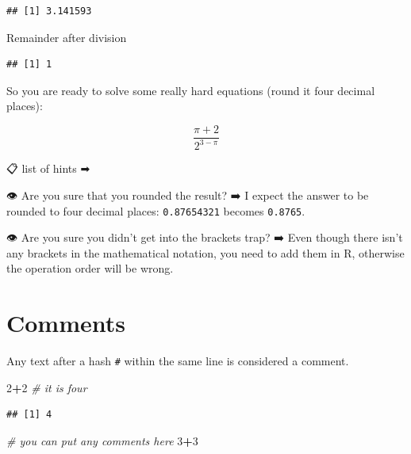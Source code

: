 \documentclass[
]{book}
\makeatletter
\newenvironment{Shaded}{\begin{snugshade}}{\end{snugshade}}
\newcommand{\CommentTok}[1]{\textcolor[rgb]{0.56,0.35,0.01}{\textit{#1}}}
\newcommand{\DecValTok}[1]{\textcolor[rgb]{0.00,0.00,0.81}{#1}}
\newcommand{\OperatorTok}[1]{\textcolor[rgb]{0.81,0.36,0.00}{\textbf{#1}}}
\newcommand{\StringTok}[1]{\textcolor[rgb]{0.31,0.60,0.02}{#1}}
\newenvironment{kframe}{%
\medskip{}
\setlength{\fboxsep}{.8em}
 \def\at@end@of@kframe{}%
 \ifinner\ifhmode%
  \def\at@end@of@kframe{\end{minipage}}%
  \begin{minipage}{\columnwidth}%
 \fi\fi%
 \def\FrameCommand##1{\hskip\@totalleftmargin \hskip-\fboxsep
 \colorbox{shadecolor}{##1}\hskip-\fboxsep
     \hskip-\linewidth \hskip-\@totalleftmargin \hskip\columnwidth}%
 \MakeFramed {\advance\hsize-\width
   \@totalleftmargin\z@ \linewidth\hsize
   \@setminipage}}%
 {\par\unskip\endMakeFramed%
 \at@end@of@kframe}
\newenvironment{rmdblock}[1]
  {
  \begin{itemize}
  \renewcommand{\labelitemi}{
    \raisebox{-.7\height}[0pt][0pt]{
      {\setkeys{Gin}{width=3em,keepaspectratio}\texttt{[image: images/\#1]}}
    }
  }
  \setlength{\fboxsep}{1em}
  \begin{kframe}
  \item
  }
  {
  \end{kframe}
  \end{itemize}
  }
\newenvironment{rmdtask}
  {\begin{rmdblock}{task}}
  {\end{rmdblock}}
\makeatother
\begin{document}
\begin{verbatim}
## [1] 3.141593
\end{verbatim}

Remainder after division

\begin{Shaded}
\end{Shaded}

\begin{verbatim}
## [1] 1
\end{verbatim}

\begin{rmdtask}
So you are ready to solve some really hard equations (round it four
decimal places):
\end{rmdtask}

\[\frac{\pi+2}{2^{3-\pi}}\]

📋 list of hints ➡

👁 Are you sure that you rounded the result? ➡
I expect the answer to be rounded to four decimal places: \texttt{0.87654321} becomes \texttt{0.8765}.

👁 Are you sure you didn't get into the brackets trap? ➡
Even though there isn't any brackets in the mathematical notation, you need to add them in R, otherwise the operation order will be wrong.

\hypertarget{comments}{%
\section{Comments}\label{comments}}

Any text after a hash \texttt{\#} within the same line is considered a comment.

\begin{Shaded}
\begin{Highlighting}[]
\DecValTok{2}\OperatorTok{+}\DecValTok{2} \CommentTok{# it is four}
\end{Highlighting}
\end{Shaded}

\begin{verbatim}
## [1] 4
\end{verbatim}

\begin{Shaded}
\begin{Highlighting}[]
\CommentTok{# you can put any comments here}
\DecValTok{3}\OperatorTok{+}\DecValTok{3}
\end{Highlighting}
\end{Shaded}
\end{document}
